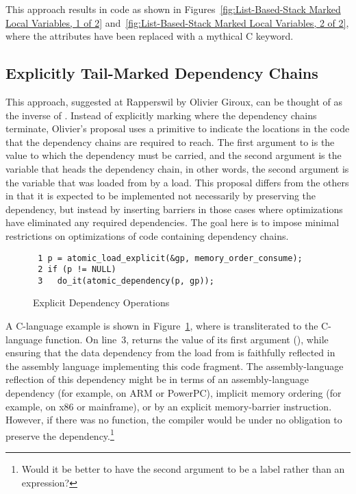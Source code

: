\documentclass[letterpaper,twocolumn,10pt]{article}
\begin{document}
This approach results in code as shown in
Figures~\ref{fig:List-Based-Stack Marked Local Variables, 1 of 2}
and~\ref{fig:List-Based-Stack Marked Local Variables, 2 of 2},
where the  attributes have been replaced
with a mythical  C keyword.

\subsection{Explicitly Tail-Marked Dependency Chains}
\label{sec:Explicitly Tail-Marked Dependency Chains}

This approach, suggested at Rapperswil by Olivier Giroux, can be thought
of as the inverse of .
Instead of explicitly marking where the dependency chains terminate,
Olivier's proposal uses a  primitive to indicate
the locations in the code that the dependency chains are required to reach.
The first argument to  is the value to which the
dependency must be carried, and the second argument is the variable that
heads the dependency chain, in other words, the second argument is the
variable that was loaded from by a  load.
This proposal differs from the others in that it is expected to be
implemented not necessarily by preserving the dependency, but instead
by inserting barriers in those cases where optimizations have eliminated
any required dependencies.
The goal here is to impose minimal restrictions on optimizations of
code containing dependency chains.

\begin{figure}[tbp]
{ \scriptsize
\begin{verbatim}
 1 p = atomic_load_explicit(&gp, memory_order_consume);
 2 if (p != NULL)
 3   do_it(atomic_dependency(p, gp));
\end{verbatim}
}
\caption{Explicit Dependency Operations}
\label{fig:Explicit Dependency Operations}
\end{figure}

A C-language example is shown in
Figure~\ref{fig:Explicit Dependency Operations},
where  is transliterated to the C-language
 function.
On line~3,  returns the value of its first
argument (), while ensuring that the data dependency from
the  load from  is faithfully reflected
in the assembly language implementing this code fragment.
The assembly-language reflection of this dependency might be in terms
of an assembly-language dependency (for example, on ARM or PowerPC),
implicit memory ordering (for example, on x86 or mainframe), or
by an explicit memory-barrier instruction.
However, if there was no  function, the compiler
would be under no obligation to preserve the dependency.\footnote{
	Would it be better to have the second argument to
	 be a label rather than an expression?}
\end{document}
